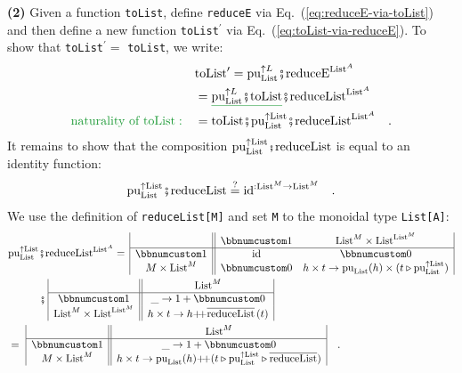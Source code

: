\textbf{(2)} Given a function \lstinline!toList!, define \lstinline!reduceE!
via Eq.~(\ref{eq:reduceE-via-toList}) and then define a new function
\lstinline!toList!$^{\prime}$ via Eq.~(\ref{eq:toList-via-reduceE}).
To show that \lstinline!toList!$^{\prime}=$ \lstinline!toList!,
we write:
\begin{align*}
 & \text{toList}^{\prime}=\text{pu}_{\text{List}}^{\uparrow L}\bef\text{reduceE}^{\text{List}^{A}}\\
 & =\gunderline{\text{pu}_{\text{List}}^{\uparrow L}\bef\text{toList}}\bef\text{reduceList}^{\text{List}^{A}}\\
{\color{greenunder}\text{naturality of }\text{toList}:}\quad & =\text{toList}\bef\text{pu}_{\text{List}}^{\uparrow\text{List}}\bef\text{reduceList}^{\text{List}^{A}}\quad.
\end{align*}
It remains to show that the composition $\text{pu}_{\text{List}}^{\uparrow\text{List}}\bef\text{reduceList}$
is equal to an identity function:
\begin{equation}
\text{pu}_{\text{List}}^{\uparrow\text{List}}\bef\text{reduceList}\overset{?}{=}\text{id}^{:\text{List}^{M}\rightarrow\text{List}^{M}}\quad.\label{eq:identity-for-reduceList-and-pure}
\end{equation}
We use the definition of \lstinline!reduceList[M]! and set \lstinline!M!
to the monoidal type \lstinline!List[A]!:
\begin{align*}
 & \text{pu}_{\text{List}}^{\uparrow\text{List}}\bef\text{reduceList}^{\text{List}^{A}}=\,\begin{array}{|c||cc|}
 & \bbnum 1 & \text{List}^{M}\times\text{List}^{\text{List}^{M}}\\
\hline \bbnum 1 & \text{id} & \bbnum 0\\
M\times\text{List}^{M} & \bbnum 0 & h\times t\rightarrow\text{pu}_{\text{List}}(h)\times(t\triangleright\text{pu}_{\text{List}}^{\uparrow\text{List}})
\end{array}\\
 & \quad\quad\quad\bef\,\begin{array}{|c||c|}
 & \text{List}^{M}\\
\hline \bbnum 1 & \_\rightarrow1+\bbnum 0\\
\text{List}^{M}\times\text{List}^{\text{List}^{M}} & h\times t\rightarrow h\pplus\overline{\text{reduceList}}\left(t\right)
\end{array}\\
 & =\,\,\begin{array}{|c||c|}
 & \text{List}^{M}\\
\hline \bbnum 1 & \_\rightarrow1+\bbnum 0\\
M\times\text{List}^{M} & h\times t\rightarrow\text{pu}_{\text{List}}(h)\pplus(t\triangleright\text{pu}_{\text{List}}^{\uparrow\text{List}}\triangleright\overline{\text{reduceList}})
\end{array}\quad.
\end{align*}

